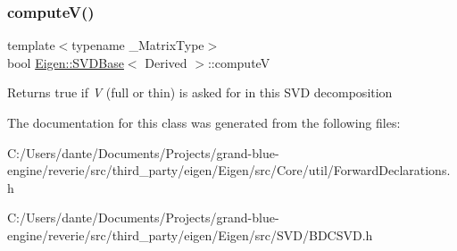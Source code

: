 \subsubsection{\texorpdfstring{computeV()}{computeV()}}
{\footnotesize\ttfamily template$<$typename \+\_\+\+Matrix\+Type$>$ \\
bool \mbox{\hyperlink{class_eigen_1_1_s_v_d_base}{Eigen\+::\+S\+V\+D\+Base}}$<$ Derived $>$\+::computeV\hspace{0.3cm}{\ttfamily [inline]}}

\begin{DoxyReturn}{Returns}
true if {\itshape V} (full or thin) is asked for in this S\+VD decomposition 
\end{DoxyReturn}


The documentation for this class was generated from the following files\+:\begin{DoxyCompactItemize}
\item 
C\+:/\+Users/dante/\+Documents/\+Projects/grand-\/blue-\/engine/reverie/src/third\+\_\+party/eigen/\+Eigen/src/\+Core/util/Forward\+Declarations.\+h\item 
C\+:/\+Users/dante/\+Documents/\+Projects/grand-\/blue-\/engine/reverie/src/third\+\_\+party/eigen/\+Eigen/src/\+S\+V\+D/B\+D\+C\+S\+V\+D.\+h\end{DoxyCompactItemize}
